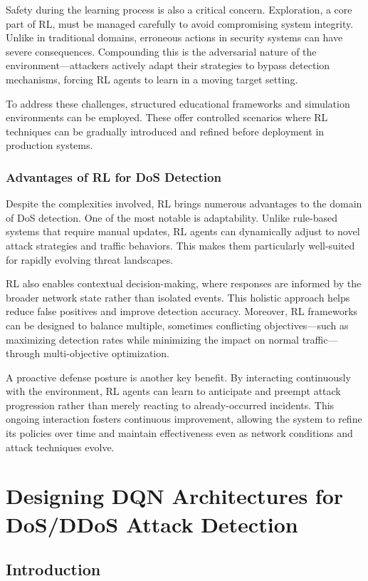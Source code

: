 \documentclass{report}
\begin{document}
Safety during the learning process is also a critical concern. Exploration, a core part of RL, must be managed carefully to avoid compromising system integrity. Unlike in traditional domains, erroneous actions in security systems can have severe consequences. Compounding this is the adversarial nature of the environment—attackers actively adapt their strategies to bypass detection mechanisms, forcing RL agents to learn in a moving target setting.

To address these challenges, structured educational frameworks and simulation environments can be employed. These offer controlled scenarios where RL techniques can be gradually introduced and refined before deployment in production systems.

\subsection{Advantages of RL for DoS Detection}

Despite the complexities involved, RL brings numerous advantages to the domain of DoS detection. One of the most notable is adaptability. Unlike rule-based systems that require manual updates, RL agents can dynamically adjust to novel attack strategies and traffic behaviors. This makes them particularly well-suited for rapidly evolving threat landscapes.

RL also enables contextual decision-making, where responses are informed by the broader network state rather than isolated events. This holistic approach helps reduce false positives and improve detection accuracy. Moreover, RL frameworks can be designed to balance multiple, sometimes conflicting objectives—such as maximizing detection rates while minimizing the impact on normal traffic—through multi-objective optimization.

A proactive defense posture is another key benefit. By interacting continuously with the environment, RL agents can learn to anticipate and preempt attack progression rather than merely reacting to already-occurred incidents. This ongoing interaction fosters continuous improvement, allowing the system to refine its policies over time and maintain effectiveness even as network conditions and attack techniques evolve.

\chapter{Designing DQN Architectures for DoS/DDoS Attack Detection}
\section{Introduction}
\end{document}
